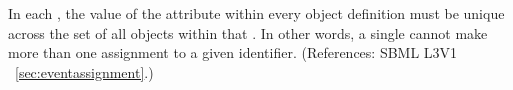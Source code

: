 In each \Event, the value of the  attribute within every
\EventAssignment object definition must be unique across the set of all
\EventAssignment objects within that \Event.  In other words, a single
\Event cannot make more than one assignment to a given identifier.
(References: SBML L3V1 ~\ref{sec:eventassignment}.)
